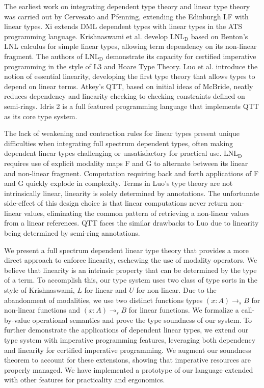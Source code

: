 \documentclass{article}
\newcommand{\LNLD}{\text{LNL}_\text{D}}
\begin{document}
  The earliest work on integrating dependent type theory and linear type theory was carried out by Cervesato and Pfenning\cite{llf}, extending the Edinburgh LF with linear types. Xi extends DML dependent types with linear types in the ATS programming language\cite{ats}. Krishnaswami et al. develop $\LNLD$\cite{neel15} based on Benton's LNL\cite{benton1994} calculus for simple linear types, allowing term dependency on its non-linear fragment. The authors of $\LNLD$ demonstrate its capacity for certified imperative programming in the style of L3\cite{l3} and Hoare Type Theory\cite{htt}.  Luo et al. introduce the notion of essential linearity\cite{luo}, developing the first type theory that allows types to depend on linear terms. Atkey's QTT\cite{qtt}, based on initial ideas of McBride\cite{nothing}, neatly reduces dependency and linearity checking to checking constraints defined on semi-rings. Idris 2\cite{idris2} is a full featured programming language that implements QTT as its core type system.

  The lack of weakening and contraction rules for linear types present unique difficulties when integrating full spectrum dependent types, often making dependent linear types challenging or unsatisfactory for practical use. $\LNLD$ requires use of explicit modality maps F and G to alternate between its linear and non-linear fragment. Computation requiring back and forth applications of F and G quickly explode in complexity. Terms in Luo's type theory are not intrinsically linear, linearity is solely determined by annotations. The unfortunate side-effect of this design choice is that linear computations never return non-linear values, eliminating the common pattern of retrieving a non-linear values from a linear references. QTT faces the similar drawbacks to Luo due to linearity being determined by semi-ring annotations.
  
  We present a full spectrum dependent linear type theory that provides a more direct approach to enforce linearity, eschewing the use of modality operators. We believe that linearity is an intrinsic property that can be determined by the type of a term. To accomplish this, our type system uses two class of type sorts in the style of Krishnaswami, $L$ for linear and $U$ for non-linear. Due to the abandonment of modalities, we use two distinct functions types $(x : A) \rightarrow_s B$ for non-linear functions and $(x : A) \multimap_s B$ for linear functions. We formalize a call-by-value operational semantics and prove the type soundness of our system. To further demonstrate the applications of dependent linear types, we extend our type system with imperative programming features, leveraging both dependency and linearity for certified imperative programming. We augment our soundness theorem to account for these extensions, showing that imperative resources are properly managed. We have implemented a prototype of our language extended with other features for practicality and ergonomics.
\end{document}
